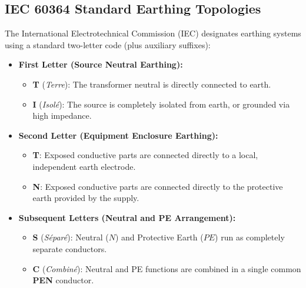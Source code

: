 \subsection{IEC 60364 Standard Earthing Topologies}
The International Electrotechnical Commission (IEC) designates earthing systems using a standard two-letter code (plus auxiliary suffixes):
\begin{itemize}
    \item \textbf{First Letter (Source Neutral Earthing):}
    \begin{itemize}
        \item \textbf{T} (\textit{Terre}): The transformer neutral is directly connected to earth.
        \item \textbf{I} (\textit{Isolé}): The source is completely isolated from earth, or grounded via high impedance.
    \end{itemize}
    \item \textbf{Second Letter (Equipment Enclosure Earthing):}
    \begin{itemize}
        \item \textbf{T}: Exposed conductive parts are connected directly to a local, independent earth electrode.
        \item \textbf{N}: Exposed conductive parts are connected directly to the protective earth provided by the supply.
    \end{itemize}
    \item \textbf{Subsequent Letters (Neutral and PE Arrangement):}
    \begin{itemize}
        \item \textbf{S} (\textit{Séparé}): Neutral ($N$) and Protective Earth ($PE$) run as completely separate conductors.
        \item \textbf{C} (\textit{Combiné}): Neutral and PE functions are combined in a single common \textbf{PEN} conductor.
    \end{itemize}
\end{itemize}

